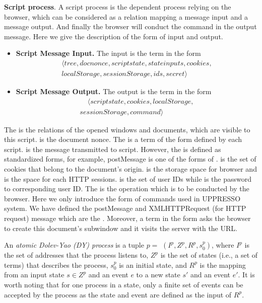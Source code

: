 \vspace{1mm}
\noindent\textbf{Script process}. A script process is the dependent process relying on the browser, which can be considered as a relation  mapping a message input and a message output. And finally the browser will conduct the command in the output message. Here we give the description of the form of input and output.
\begin{itemize}
\setlength\itemsep{-2pt}
\item \textbf{Script Message Input. } The input is the term in the form
\begin{multline*}
\langle tree, docnonce, scriptstate, stateinputs,cookies,\\
localStorage, sessionStorage, ids, secret \rangle
\end{multline*}
\item \textbf{Script Message Output. }The output is the term in the form
\begin{multline*}
\ \ \ \ \ \langle scriptstate, cookies, localStorage, \\
sessionStorage, command \rangle \ \ \ \ \
\end{multline*}
\end{itemize}
The  is the relations of the opened windows and documents, which are visible to this script.  is the document nonce. The   is a term of the form defined by each script.  is the message transmitted to script. However, the  is defined as standardized forms, for example, postMessage is one of the forms of .  is the set of cookies that belong to the document's origin.  is the storage space for browser and  is the space for each HTTP sessions.   is the set of user IDs while  is the password to corresponding user ID. The  is the operation which is to be conducted by the browser. Here we only introduce the form of commands used in UPPRESSO system. We have defined the postMessage and XMLHTTPRequest (for HTTP request) message which are the . Moreover, a term in the form  asks the browser to create this document's subwindow and it visits the server with the URL.


An {\em atomic Dolev-Yao (DY) process} is a tuple $p=$ $(I^p, Z^p, R^p,s_0^p )$, where $I^p$ is the set of addresses that the process listens to, $Z^p$ is the set of states (i.e., a set of terms) that describes the process, $s_0^p$ is an initial state, and $R^p$ is the mapping from an input state $s \in Z^p$ and an event $e$ to a new state $s'$ and an event $e'$. It is worth noting that for one process in a state, only a finite set of events can be accepted by the process as the state and event are defined as the input of $R^p$.


